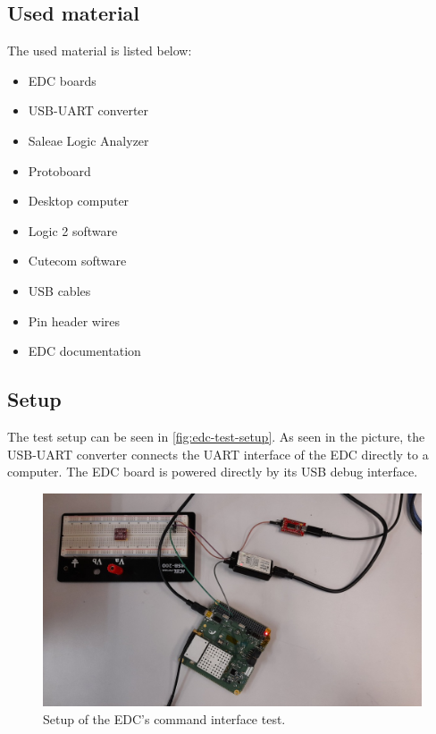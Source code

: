 \subsection{Used material}

The used material is listed below:

\begin{itemize}
    \item EDC boards
    \item USB-UART converter
    \item Saleae Logic Analyzer
    \item Protoboard
    \item Desktop computer
    \item Logic 2 software
    \item Cutecom software
    \item USB cables
    \item Pin header wires
    \item EDC documentation
\end{itemize}

\subsection{Setup}

The test setup can be seen in \autoref{fig:edc-test-setup}. As seen in the picture, the USB-UART converter connects the UART interface of the EDC directly to a computer. The EDC board is powered directly by its USB debug interface.

\begin{figure}[!ht]
    \begin{center}
        \includegraphics[width=\textwidth]{figures/edc_report/cmd-test-setup}
        \caption{Setup of the EDC's command interface test.}
        \label{fig:edc-test-setup}
    \end{center}
\end{figure}

